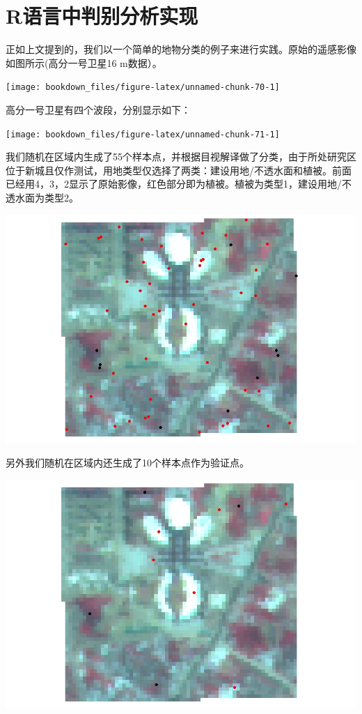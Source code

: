 \documentclass[]{ctexbook}
\begin{document}
\hypertarget{rux8bedux8a00ux4e2dux5224ux522bux5206ux6790ux5b9eux73b0}{%
\section{R语言中判别分析实现}\label{rux8bedux8a00ux4e2dux5224ux522bux5206ux6790ux5b9eux73b0}}

正如上文提到的，我们以一个简单的地物分类的例子来进行实践。原始的遥感影像如图所示(高分一号卫星16 m数据）。

\texttt{[image: bookdown\_files/figure-latex/unnamed-chunk-70-1]}

高分一号卫星有四个波段，分别显示如下：

\texttt{[image: bookdown\_files/figure-latex/unnamed-chunk-71-1]}

我们随机在区域内生成了55个样本点，并根据目视解译做了分类，由于所处研究区位于新城且仅作测试，用地类型仅选择了两类：建设用地/不透水面和植被。前面已经用4，3，2显示了原始影像，红色部分即为植被。植被为类型1，建设用地/不透水面为类型2。

\includegraphics[width=1\linewidth,height=0.5\textheight]{fig/fig35}

另外我们随机在区域内还生成了10个样本点作为验证点。

\includegraphics[width=1\linewidth,height=0.5\textheight]{fig/fig36}
\end{document}
